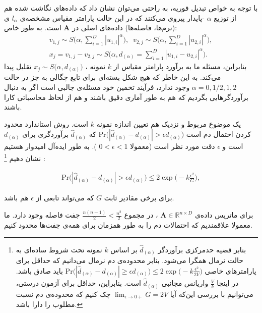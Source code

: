 با توجه به خواص تبدیل فوریه، به راحتی می‌توان نشان داد که داده‌های نگاشت شده هم از توزیع 
$\alpha$%
-پایدار پیروی می‌کنند که در این حالت پارامتر مقیاس مشخصه‌ی 
$l_\alpha$
ی (نرم‌ها، فاصله‌ها) داده‌های اصلی در 
$\mathbf{A}$
است. به طور خاص:
\begin{align}
v_{1,j} \sim S \bigg( \alpha, \sum_{i=1}^D |u_{1,i}|^\alpha \bigg), \;\;
v_{2,j} \sim S \bigg( \alpha, \sum_{i=1}^D |u_{2,i}|^\alpha \bigg),
 \label{eq:1hp}\\
x_j = v_{1,j} - v_{2,j} \sim S \bigg( \alpha, d_{(\alpha)} = 
\sum_{i=1}^D | u_{1,i} - u_{2,i} |^\alpha \bigg).
 \label{eq:1hq}
\end{align}
بنابراین، مسئله ما به برآورد پارامتر مقیاس از 
$k$
نمونه 
، 
$x_j \sim S \big( \alpha, d_{(\alpha)} \big)$
تقلیل پیدا می‌کند. به این خاطر که هیچ شکل بسته‌ای برای تابع چگالی به جز در حالت 
$\alpha = 0, 1/2, 1, 2$
وجود ندارد، فرآیند تخمین خود مسئله‌ی جالبی است اگر به دنبال برآوردگرهایی بگردیم که هم به طور آماری دقیق باشند و هم از لحاظ محاسباتی کارا باشند.

یک موضوع مربوط و نزدیک هم تعیین اندازه نمونه
$k$
است. روش استاندارد محدود کردن احتمال دم است 
$\mathrm{Pr} \big( | \hat{d}_{(\alpha)} - d_{(\alpha)} | > \epsilon d_{(\alpha)} \big)$
که 
$\hat{d}_{(\alpha)}$
برآوردگری برای
$d_{(\alpha)}$
است و 
$\epsilon$
دقت مورد نظر است (معمولا 
$0<\epsilon<1$
). به طور ایده‌آل امیدوار هستیم نشان دهیم
\footnote{
بنابر قضیه حدمرکزی برآوردگر 
$\hat{d}_{(\alpha)}$
بر اساس
$k$
نمونه تحت شروط ساده‌ای به حالت نرمال همگرا می‌شود. بنابر محدوده‌ی دم نرمال می‌دانیم که حداقل برای پارامترهای خاصی 
$\mathrm{Pr} \big( | \hat{d}_{(\alpha)} - d_{(\alpha)} | \geq \epsilon d_{(\alpha)} \big) \leq 2 \exp \Big( -k \frac{\epsilon^2}{2V} \Big)$
باید صادق باشد. در اینجا 
$\frac{V}{k}$
واریانس مجانبی 
$\hat{d}_{(\alpha)}$
است. بنابراین، حداقل برای آزمون درستی، می‌توانیم با بررسی این‌که آیا
$\lim_{\epsilon \rightarrow 0+} G = 2V$
چک کنیم که محدوده‌ی دم نسبت مطلوب را دارا باشد.
}
:

\begin{align}
\mathrm{Pr} \big( | \hat{d}_{(\alpha)} - d_{(\alpha)}| > \epsilon d_{(\alpha)} \big) \leq 2 \exp \bigg( -k \frac{\epsilon^2}{G} \bigg),
\label{eq:1hr}
\end{align}

برای برخی مقادیر ثابت 
$G$
که می‌تواند تابعی از 
$\epsilon$
هم باشد.

برای ماتریس داده‌ی
$\mathbf{A} \in \mathbb{R}^{n \times D}$
، در مجموع 
$\frac{n(n-1)}{2} < \frac{n^2}{2}$
جفت فاصله وجود دارد. ما معمولا علاقمندیم که احتمالات دم را به طور همزمان برای همه‌ی جفت‌ها محدود کنیم. 

